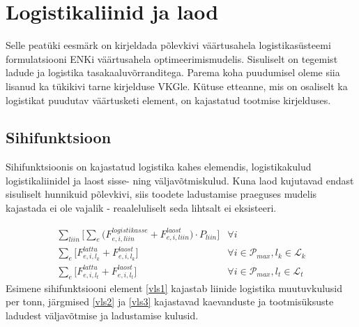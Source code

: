 \documentclass[10pt,a4paper]{article}
\begin{document}
\section{Logistikaliinid ja laod}
Selle peatüki eesmärk on kirjeldada põlevkivi väärtusahela logistikasüsteemi formulatsiooni ENKi väärtusahela optimeerimismudelis. Sisuliselt on tegemist ladude ja logistika tasakaaluvõrranditega. Parema koha puudumisel oleme siia lisanud ka tükikivi tarne kirjelduse VKGle. Kütuse etteanne, mis on osaliselt ka logistikat puudutav väärtusketi element, on kajastatud tootmise kirjelduses.

\subsection{Sihifunktsioon}
Sihifunktsioonis on kajastatud logistika kahes elemendis, logistikakulud logistikaliinidel ja laost sisse- ning väljavõtmiskulud. Kuna laod kujutavad endast sisuliselt hunnikuid põlevkivi, siis toodete ladustamise praeguses mudelis kajastada ei ole vajalik - reaaleluliselt seda lihtsalt ei eksisteeri.

\begin{align}
\sum_{liin} \bigg[\sum_e \bigg( F^{logistikasse}_{e,i,liin} + F^{laost}_{e,i,liin} \bigg)\cdot P_{liin} \bigg] &\forall i \label{vls1} \\
\sum_{e} \bigg[ F^{lattu}_{e,i,l_k} + F^{laost}_{e,i,l_k} \bigg] &\forall i\in\mathcal{P}_{max},l_k\in\mathcal{L}_k \label{vls2} \\
\sum_{e} \bigg[ F^{lattu}_{e,i,l_t} + F^{laost}_{e,i,l_t} \bigg] &\forall i\in\mathcal{P}_{max},l_t\in\mathcal{L}_t \label{vls3} 
\end{align}
Esimene sihifunktsiooni element \eqref{vls1} kajastab liinide logistika muutuvkulusid per tonn, järgmised \eqref{vls2} ja \eqref{vls3} kajastavad kaevanduste ja tootmisüksuste ladudest väljavõtmise ja ladustamise kulusid.
\end{document}
